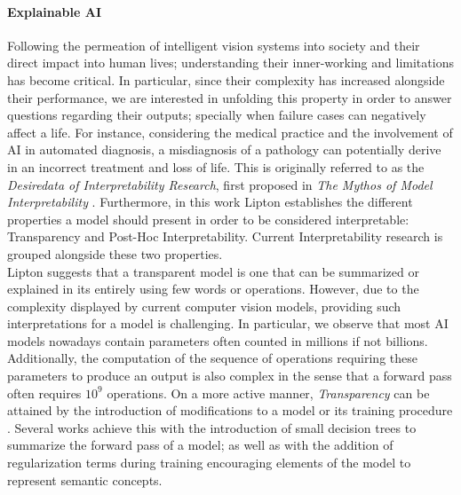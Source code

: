 \paragraph{Explainable AI} Following the permeation of intelligent vision systems into society and 
their direct impact into human lives; understanding their inner-working and limitations has become 
critical. In particular, since their complexity has increased alongside their performance, we are 
interested in unfolding this property in order to answer questions regarding their outputs; 
specially when failure cases can negatively affect a life. For instance, considering the medical 
practice and the involvement of AI in automated diagnosis, a misdiagnosis of a pathology can 
potentially derive in an incorrect treatment and loss of life. This is originally referred to as the 
\emph{Desiredata of Interpretability Research}, first proposed in \emph{The Mythos of Model 
Interpretability} \autocite{mythos_interp}. Furthermore, in this work Lipton establishes the 
different properties a model should present in order to be considered interpretable: Transparency 
and Post-Hoc Interpretability. Current Interpretability research is grouped alongside these 
two properties.\\

\noindent Lipton suggests that a transparent model is one that can be summarized or explained 
in its entirely using few words or operations. However, due to the complexity displayed by current 
computer vision models, providing such interpretations for a model is challenging. In particular, 
we observe that most AI models nowadays contain parameters often counted in millions if not 
billions. Additionally, the computation of the sequence of operations requiring these parameters 
to produce an output is also complex in the sense that a forward pass often requires $10^9$ 
operations. On a more active manner, \emph{Transparency} can be attained by the introduction of 
modifications to a model or its training procedure \autocite{zhang2021survey}. Several works 
achieve this with the introduction of small decision trees to summarize the forward pass of a 
model; as well as with the addition of regularization terms during training encouraging elements 
of the model to represent semantic concepts.\\



